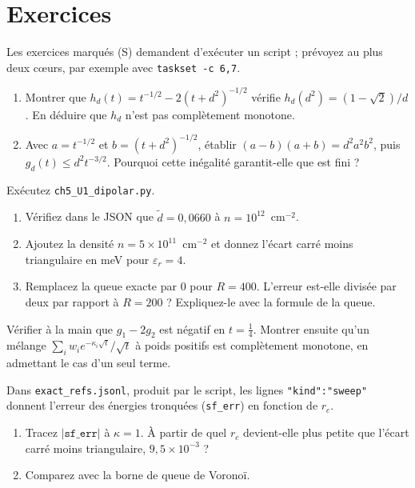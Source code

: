 
\section{Exercices}\label{ch5:exercices}
Les exercices marqués (S) demandent d'exécuter un script ; prévoyez au plus deux c\oe urs, par exemple avec
\texttt{taskset -c 6,7}.

\begin{exercise}[U1, calcul]\label{ch5:ex:hd}
\begin{enumerate}
\item Montrer que $h_d(t)=t^{-1/2}-2(t+d^2)^{-1/2}$ vérifie $h_d(d^2)=(1-\sqrt2)/d$. En déduire que $h_d$ n'est
pas complètement monotone.
\item Avec $a=t^{-1/2}$ et $b=(t+d^2)^{-1/2}$, établir $(a-b)(a+b)=d^2a^2b^2$, puis $g_d(t)\le d^2t^{-3/2}$.
Pourquoi cette inégalité garantit-elle que  est fini ?
\end{enumerate}
\end{exercise}

\begin{exercise}[U1, (S)]\label{ch5:ex:U1}
Exécutez \texttt{ch5\_U1\_dipolar.py}.
\begin{enumerate}
\item Vérifiez dans le JSON que $\tilde d=0{,}0660$ à $n=10^{12}$~cm$^{-2}$.
\item Ajoutez la densité $n=5\times10^{11}$~cm$^{-2}$ et donnez l'écart carré moins triangulaire en meV pour
$\varepsilon_r=4$.
\item Remplacez la queue exacte par $0$ pour $R=400$. L'erreur est-elle divisée par deux par rapport à $R=200$ ?
Expliquez-le avec la formule de la queue.
\end{enumerate}
\end{exercise}

\begin{exercise}[U2, calcul]\label{ch5:ex:U2a}
Vérifier à la main que $g_1-2g_2$ est négatif en $t=\tfrac14$. Montrer ensuite qu'un mélange
$\sum_iw_ie^{-\kappa_i\sqrt t}/\sqrt t$ à poids positifs est complètement monotone, en admettant le cas d'un seul
terme.
\end{exercise}

\begin{exercise}[U2, (S)]\label{ch5:ex:U2b}
Dans \texttt{exact\_refs.jsonl}, produit par le script, les lignes \texttt{"kind":"sweep"} donnent l'erreur des
énergies tronquées (\texttt{sf\_err}) en fonction de $r_c$.
\begin{enumerate}
\item Tracez $|\texttt{sf\_err}|$ à $\kappa=1$. À partir de quel $r_c$ devient-elle plus petite que l'écart carré moins
triangulaire, $9{,}5\times10^{-3}$ ?
\item Comparez avec la borne de queue de Voronoï.
\end{enumerate}
\end{exercise}

